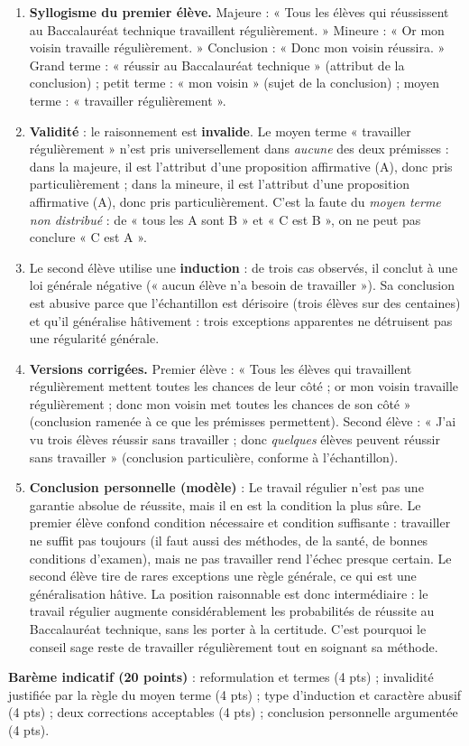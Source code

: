 \documentclass[11pt]{article}
\begin{document}
\begin{corrige}
\begin{enumerate}
\item \textbf{Syllogisme du premier élève.} Majeure : « Tous les élèves qui réussissent au Baccalauréat technique travaillent régulièrement. » Mineure : « Or mon voisin travaille régulièrement. » Conclusion : « Donc mon voisin réussira. » Grand terme : « réussir au Baccalauréat technique » (attribut de la conclusion) ; petit terme : « mon voisin » (sujet de la conclusion) ; moyen terme : « travailler régulièrement ».
\item \textbf{Validité} : le raisonnement est \textbf{invalide}. Le moyen terme « travailler régulièrement » n'est pris universellement dans \emph{aucune} des deux prémisses : dans la majeure, il est l'attribut d'une proposition affirmative (A), donc pris particulièrement ; dans la mineure, il est l'attribut d'une proposition affirmative (A), donc pris particulièrement. C'est la faute du \emph{moyen terme non distribué} : de « tous les A sont B » et « C est B », on ne peut pas conclure « C est A ».
\item Le second élève utilise une \textbf{induction} : de trois cas observés, il conclut à une loi générale négative (« aucun élève n'a besoin de travailler »). Sa conclusion est abusive parce que l'échantillon est dérisoire (trois élèves sur des centaines) et qu'il généralise hâtivement : trois exceptions apparentes ne détruisent pas une régularité générale.
\item \textbf{Versions corrigées.} Premier élève : « Tous les élèves qui travaillent régulièrement mettent toutes les chances de leur côté ; or mon voisin travaille régulièrement ; donc mon voisin met toutes les chances de son côté » (conclusion ramenée à ce que les prémisses permettent). Second élève : « J'ai vu trois élèves réussir sans travailler ; donc \emph{quelques} élèves peuvent réussir sans travailler » (conclusion particulière, conforme à l'échantillon).
\item \textbf{Conclusion personnelle (modèle)} : Le travail régulier n'est pas une garantie absolue de réussite, mais il en est la condition la plus sûre. Le premier élève confond condition nécessaire et condition suffisante : travailler ne suffit pas toujours (il faut aussi des méthodes, de la santé, de bonnes conditions d'examen), mais ne pas travailler rend l'échec presque certain. Le second élève tire de rares exceptions une règle générale, ce qui est une généralisation hâtive. La position raisonnable est donc intermédiaire : le travail régulier augmente considérablement les probabilités de réussite au Baccalauréat technique, sans les porter à la certitude. C'est pourquoi le conseil sage reste de travailler régulièrement tout en soignant sa méthode.
\end{enumerate}
\textbf{Barème indicatif (20 points)} : reformulation et termes (4 pts) ; invalidité justifiée par la règle du moyen terme (4 pts) ; type d'induction et caractère abusif (4 pts) ; deux corrections acceptables (4 pts) ; conclusion personnelle argumentée (4 pts).
\end{corrige}
\end{document}
